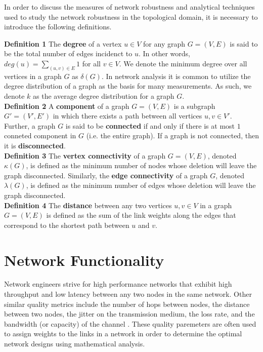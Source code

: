 \documentclass[doc]{apa}%
\begin{document}
In order to discuss the measures of network robustness and analytical techniques used to study the network robustness in the topological domain, it is necessary to introduce the following definitions.

\textbf{Definition 1}
The \textbf{degree} of a vertex $u \in V$ for any graph $G = (V,E)$ is said to be the total number of edges incidenct to $u$. In other words, $deg(u) = \sum_{(u,v) \in E} 1$ for all $v \in V$. We denote the minimum degree over all vertices in a graph $G$ as $\delta(G)$. In network analysis it is common to utilize the degree distribution of a graph as the basis for many measurements. As such, we denote $k$ as the average degree distribution for a graph $G$.\\

\textbf{Definition 2}
A \textbf{component} of a graph $G = (V,E)$ is a subgraph $G' = (V',E')$ in which there exists a path between all vertices $u, v \in V'$. Further, a graph $G$ is said to be \textbf{connected} if and only if there is at most $1$ conneted component in $G$ (i.e. the entire graph). If a graph is not connected, then it is \textbf{disconnected}.\\

\textbf{Definition 3}
The \textbf{vertex connectivity} of a graph $G = (V,E)$, denoted $\kappa(G)$, is defined as the minimum number of nodes whose deletion will leave the graph disconnected. Similarly, the \textbf{edge connectivity} of a graph $G$, denoted $\lambda(G)$, is defined as the minimum number of edges whose deletion will leave the graph disconnected.\\

\textbf{Definition 4}
The \textbf{distance} between any two vertices $u, v \in V$ in a graph $G = (V,E)$ is defined as the sum of the link weights along the edges that correspond to the shortest path between $u$ and $v$.


\section{Network Functionality}
\label{NetworkFunctionality}

Network engineers strive for high performance networks that exhibit high throughput and low latency between any two nodes in the same network. Other similar quality metrics include the number of hops between nodes, the distance between two nodes, the jitter on the transmission medium, the loss rate, and the bandwidth (or capacity) of the channel \cite{LargeNetworkRobustnessPVM}. These quality paremeters are often used to assign weights to the links in a network in order to determine the optimal network designs using mathematical analysis. 
\end{document}
